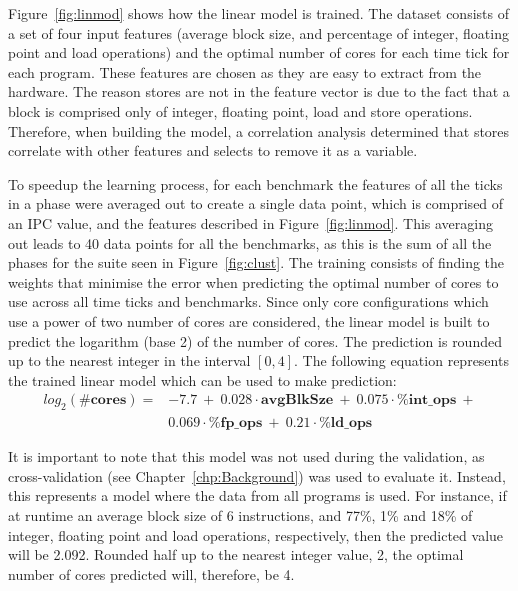 Figure~\ref{fig:linmod} shows how the linear model is trained.
The dataset consists of a set of four input features (average block size, and percentage of integer, floating point and load operations) and the optimal number of cores for each time tick for each program.
These features are chosen as they are easy to extract from the hardware.
The reason stores are not in the feature vector is due to the fact that a block is comprised only of integer, floating point, load and store operations.
Therefore, when building the model, a correlation analysis determined that stores correlate with other features and selects to remove it as a variable.

To speedup the learning process, for each benchmark the features of all the ticks in a phase were averaged out to create a single data point, which is comprised of an IPC value, and the features described in Figure~\ref{fig:linmod}.
This averaging out leads to 40 data points for all the benchmarks, as this is the sum of all the phases for the suite seen in Figure~\ref{fig:clust}.
The training consists of finding the weights that minimise the error when predicting the optimal number of cores to use across all time ticks and benchmarks.
Since only core configurations which use a power of two number of cores are considered, the linear model is built to predict the logarithm (base 2) of the number of cores.
The prediction is rounded up to the nearest integer in the interval $[0,4]$.
The following equation represents the trained linear model which can be used to make prediction:
\vspace{-1em}
\begin{align*}
  log_2(\textbf{\#cores}) = & -7.7\ +\ 0.028 \cdot \textbf{avgBlkSze}\ +\ 0.075 \cdot \textbf{\%int\_ops}\ +\\
 &0.069 \cdot \textbf{\%fp\_ops}\ +\ 0.21 \cdot \textbf{\%ld\_ops}
\end{align*}

It is important to note that this model was not used during the validation, as cross-validation (see Chapter~\ref{chp:Background}) was used to evaluate it.
Instead, this represents a model where the data from all programs is used.
For instance, if at runtime an average block size of 6 instructions, and 77\%, 1\% and 18\% of integer, floating point and load operations, respectively, then the predicted value will be 2.092.
Rounded half up to the nearest integer value, 2, the optimal number of cores predicted will, therefore, be 4.

